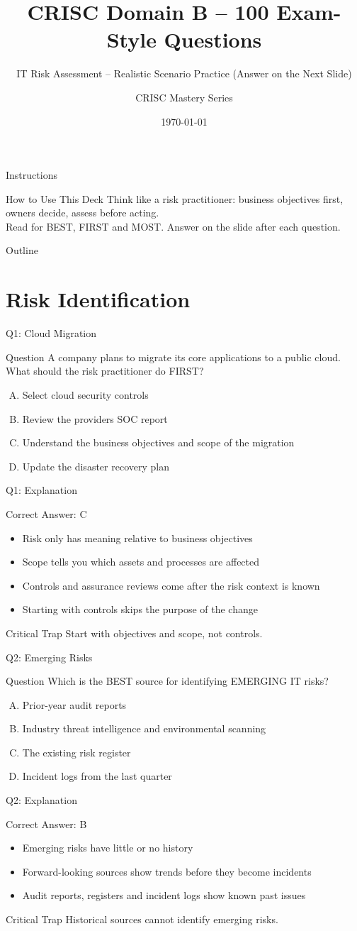\documentclass[aspectratio=169]{beamer}
\title{CRISC Domain B -- 100 Exam-Style Questions}
\subtitle{IT Risk Assessment -- Realistic Scenario Practice (Answer on the Next Slide)}
\author{CRISC Mastery Series}
\date{\today}
\newcommand{\hq}[7]{%
	\begin{frame}{Q#1: #2}
		\begin{block}{Question}
			#3
		\end{block}
		\begin{enumerate}[(A)]
			#4
		\end{enumerate}
	\end{frame}
	\begin{frame}{Q#1: Explanation}
		\begin{block}{Correct Answer: #5}
			\begin{itemize}
				#6
			\end{itemize}
		\end{block}
		\begin{alertblock}{Critical Trap}
			#7
		\end{alertblock}
	\end{frame}
}
\begin{document}
	
	\begin{frame}
		\titlepage
	\end{frame}
	
	\begin{frame}{Instructions}
		\begin{alertblock}{How to Use This Deck}
			Think like a risk practitioner: business objectives first, owners decide, assess before acting.\\
			Read for BEST, FIRST and MOST. Answer on the slide after each question.
		\end{alertblock}
	\end{frame}
	
	\begin{frame}{Outline}
		\tableofcontents
	\end{frame}
	
	\section{Risk Identification}
	
	\hq{1}{Cloud Migration}
	{A company plans to migrate its core applications to a public cloud. What should the risk practitioner do FIRST?}
	{\item Select cloud security controls
		\item Review the provider\textquotesingle s SOC report
		\item Understand the business objectives and scope of the migration
		\item Update the disaster recovery plan}
	{C}
	{\item Risk only has meaning relative to business objectives
		\item Scope tells you which assets and processes are affected
		\item Controls and assurance reviews come after the risk context is known
		\item Starting with controls skips the purpose of the change}
	{Start with objectives and scope, not controls.}
	
	\hq{2}{Emerging Risks}
	{Which is the BEST source for identifying EMERGING IT risks?}
	{\item Prior-year audit reports
		\item Industry threat intelligence and environmental scanning
		\item The existing risk register
		\item Incident logs from the last quarter}
	{B}
	{\item Emerging risks have little or no history
		\item Forward-looking sources show trends before they become incidents
		\item Audit reports, registers and incident logs show known past issues}
	{Historical sources cannot identify emerging risks.}
	
\end{document}

